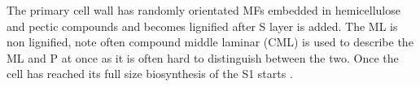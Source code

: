 The primary cell wall has randomly orientated MFs embedded
in hemicellulose and pectic compounds and becomes lignified after S layer is added.
The ML is non lignified, note often compound middle laminar (CML) is used to describe
the ML and P at once as it is often hard to distinguish between the two. Once the cell has reached its
full size biosynthesis of the S1 starts \cite{fromm2013cellular}.